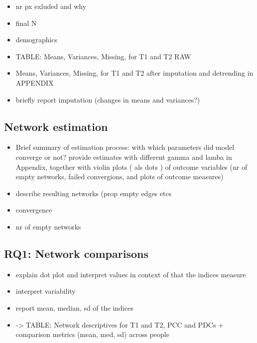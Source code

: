 \documentclass[
  english,
  man]{apa6}
\providecommand{\tightlist}{%
  \setlength{\itemsep}{0pt}\setlength{\parskip}{0pt}}
\begin{document}
\begin{itemize}
\tightlist
\item
  nr px exluded and why
\item
  final N
\item
  demographics
\item
  TABLE: Means, Variances, Missing, for T1 and T2 RAW
\item
  Means, Variances, Missing, for T1 and T2 after imputation and detrending in APPENDIX
\item
  briefly report imputation (changes in means and variances?)
\end{itemize}

\hypertarget{network-estimation-1}{%
\subsection{Network estimation}\label{network-estimation-1}}

\begin{itemize}
\tightlist
\item
  Brief summary of estimation process: with which parameters did model converge or not? provide estimates with different gamma and lamba in Appendix, together with violin plots ( als dots ) of outcome variables (nr of empty networks, failed convergions, and plots of outcome measures)
\item
  describe resulting networks (prop empty edges etcs
\item
  convergence
\item
  nr of empty networks
\end{itemize}

\hypertarget{rq1-network-comparisons-1}{%
\subsection{RQ1: Network comparisons}\label{rq1-network-comparisons-1}}

\begin{itemize}
\tightlist
\item
  explain dot plot and interpret values in context of that the indices measure
\item
  interpret variability
\item
  report mean, median, sd of the indices
\item
  -\textgreater{} TABLE: Network descriptives for T1 and T2, PCC and PDCs + comparison metrics (mean, med, sd) across people
\end{itemize}
\end{document}
